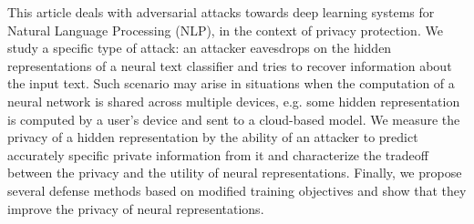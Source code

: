 This article deals with adversarial attacks towards deep learning systems for Natural Language Processing (NLP), in the context of privacy protection. We study a specific type of attack: an attacker eavesdrops on the hidden representations of a neural text classifier and tries to recover information about the input text. Such scenario may arise in situations when the computation of a neural network is shared across multiple devices, e.g. some hidden representation is computed by a user's device and sent to a cloud-based model. We measure the privacy of a hidden representation by the ability of an attacker to predict accurately specific private information from it and characterize the tradeoff between the privacy and the utility of neural representations. Finally, we propose several defense methods based on modified training objectives and show that they improve the privacy of neural representations.
